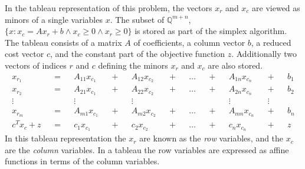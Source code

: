 \documentclass[11pt]{article} %
\begin{document}
In the tableau representation of this problem, the vectors $x_r$ and $x_c$ are viewed as minors of a single variables $x$. The subset of $\mathbb{Q}^{m+n}$, $\{x : x_c = Ax_r + b \wedge x_c \ge 0 \wedge x_r \ge 0\}$ is stored as part of the simplex algorithm. The tableau consists of a matrix $A$ of coefficients, a column vector $b$, a reduced cost vector $c$, and the constant part of the objective function $z$. Additionally two vectors of indices $r$ and $c$ defining the minors $x_r$ and $x_c$ are also stored.
\begin{equation}
  \begin{aligned}
    x_{r_1} && = && A_{11}x_{c_1} && + && A_{12}x_{c_2} && + && \dots && + && A_{1n}x_{c_n} && + && b_1 \\
    x_{r_2} && = && A_{21}x_{c_1} && + && A_{22}x_{c_2} && + && \dots && + && A_{2n}x_{c_n} && + && b_2 \\
    \vdots && && \vdots && && \vdots && && && && \vdots && \vdots \\
    x_{r_m} && = && A_{m1}x_{c_1} && + && A_{m2}x_{c_2} && + && \dots && + && A_{mn}x_{c_n} && + && b_n \\
    c^Tx_c + z && = && c_1x_{c_1} && + && c_2x_{c_2} && + && \dots && + && c_nx_{c_n} && + && z
  \end{aligned}
\end{equation}
In this tableau representation the $x_r$ are known as the \textit{row} variables, and the $x_c$ are the \textit{column} variables. In a tableau the row variables are expressed as affine functions in terms of the column variables.
\end{document}
